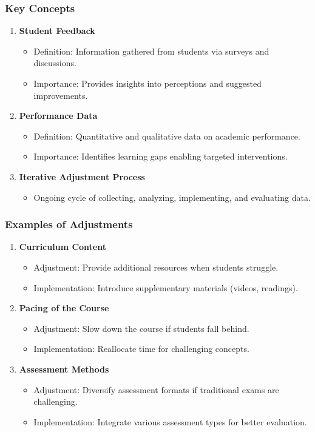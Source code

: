 \documentclass[aspectratio=169]{beamer}
\begin{document}
\begin{frame}[fragile]
    \frametitle{Key Concepts}
    \begin{enumerate}
        \item \textbf{Student Feedback}
            \begin{itemize}
                \item Definition: Information gathered from students via surveys and discussions.
                \item Importance: Provides insights into perceptions and suggested improvements.
            \end{itemize}
        \item \textbf{Performance Data}
            \begin{itemize}
                \item Definition: Quantitative and qualitative data on academic performance.
                \item Importance: Identifies learning gaps enabling targeted interventions.
            \end{itemize}
        \item \textbf{Iterative Adjustment Process}
            \begin{itemize}
                \item Ongoing cycle of collecting, analyzing, implementing, and evaluating data.
            \end{itemize}
    \end{enumerate}
\end{frame}

\begin{frame}[fragile]
    \frametitle{Examples of Adjustments}
    \begin{enumerate}
        \item \textbf{Curriculum Content}
            \begin{itemize}
                \item Adjustment: Provide additional resources when students struggle.
                \item Implementation: Introduce supplementary materials (videos, readings).
            \end{itemize}
        \item \textbf{Pacing of the Course}
            \begin{itemize}
                \item Adjustment: Slow down the course if students fall behind.
                \item Implementation: Reallocate time for challenging concepts.
            \end{itemize}
        \item \textbf{Assessment Methods}
            \begin{itemize}
                \item Adjustment: Diversify assessment formats if traditional exams are challenging.
                \item Implementation: Integrate various assessment types for better evaluation.
            \end{itemize}
    \end{enumerate}
\end{frame}
\end{document}

